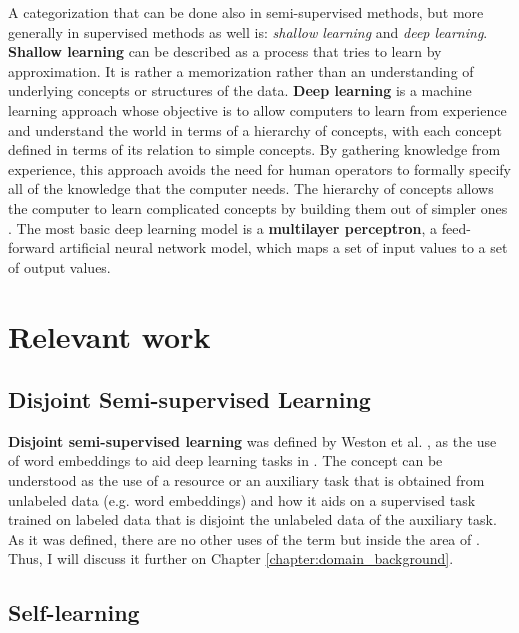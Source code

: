A categorization that can be done also in semi-supervised methods, but more
generally in supervised methods as well is: {\em shallow learning} and {\em
deep learning}. {\bf Shallow learning} can be described as a process that
tries to learn by approximation. It is rather a memorization rather than an
understanding of underlying concepts or structures of the data. {\bf Deep
learning} is a machine learning approach whose objective is to allow computers
to learn from experience and understand the world in terms of a hierarchy of
concepts, with each concept defined in terms of its relation to simple
concepts. By gathering knowledge from experience, this approach avoids the need
for human operators to formally specify all of the knowledge that the computer
needs. The hierarchy of concepts allows the computer to learn complicated
concepts by building them out of simpler ones
\cite{Goodfellow-et-al-2016-Book}. The most basic deep learning model is a {\bf
multilayer perceptron}, a feed-forward artificial neural network model, which
maps a set of input values to a set of output values. 

\section{Relevant work}\label{sec:general_background:relevant}

\subsection{Disjoint Semi-supervised Learning}

{\bf Disjoint semi-supervised learning} was defined by Weston et al.
\cite{Weston2008}, as the use of word embeddings to aid deep learning tasks in
\nlp. The concept can be understood as the use of a resource or an auxiliary
task that is obtained from unlabeled data (e.g. word embeddings) and how it
aids on a supervised task trained on labeled data that is disjoint the
unlabeled data of the auxiliary task. As it was defined, there are no other
uses of the term but inside the area of \nlp. Thus, I will discuss it further
on Chapter \ref{chapter:domain_background}.

\subsection{Self-learning}\label{sec:general_background:self-learning}

